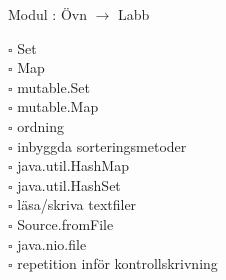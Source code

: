
    Modul : Övn  $\rightarrow$ Labb 
    \begin{multicols}{3}\SlideFontTiny
    $\square$ Set \\
$\square$ Map \\
$\square$ mutable.Set \\
$\square$ mutable.Map \\
$\square$ ordning \\
$\square$ inbyggda sorteringsmetoder \\
$\square$ java.util.HashMap \\
$\square$ java.util.HashSet \\
$\square$ läsa/skriva textfiler \\
$\square$ Source.fromFile \\
$\square$ java.nio.file \\
$\square$ repetition inför kontrollskrivning \\
    \end{multicols}
    